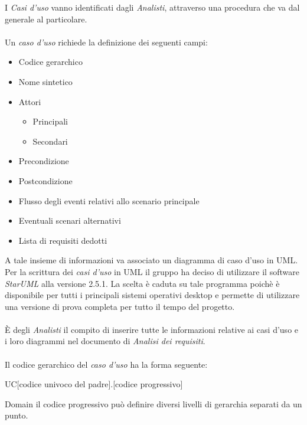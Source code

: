 \documentclass[a4paper]{report}
\begin{document}
		 I \emph{Casi d'uso} vanno identificati dagli \emph{Analisti}, attraverso una procedura che va dal 
		 generale al particolare. 
		  \\ \\
		 Un \emph{caso d'uso} richiede la definizione dei seguenti campi:
		 \begin{itemize}
		 	\item Codice gerarchico 
		 	\item Nome sintetico
		 	\item Attori
		 	\begin{itemize}
		 		\item Principali
		 		\item Secondari
		 	\end{itemize}
		 	\item Precondizione
		 	\item Postcondizione
		 	\item Flusso degli eventi relativi allo scenario principale
		 	\item Eventuali scenari alternativi
		 	\item Lista di requisiti dedotti 
		 \end{itemize}
		 A tale insieme di informazioni va associato un diagramma di caso d'uso in UML. Per la 
		 scrittura dei \emph{casi d'uso} in UML il gruppo ha deciso di utilizzare il software
		  \emph{StarUML} alla versione 2.5.1. La scelta è  caduta su tale programma poichè 
		  è disponibile per tutti i principali sistemi operativi desktop e permette di
		   utilizzare una versione di prova completa per tutto il tempo del progetto.
		  \\ \\
		  È degli \emph{Analisti} il compito di inserire tutte le informazioni relative ai casi 
		  d'uso e i loro diagrammi nel documento di \emph{Analisi dei requisiti}.
		  \\ \\
		 Il codice gerarchico del \emph{caso d'uso} ha la forma seguente:
		 \begin{center}
		 	UC[codice univoco del padre].[codice progressivo]
		 \end{center}Domain
		 il codice progressivo può definire diversi livelli di gerarchia separati da un punto.
\end{document}
